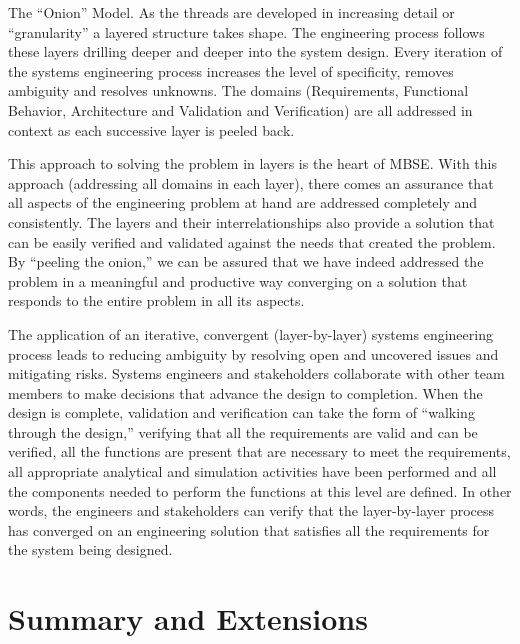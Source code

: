 The ``Onion'' Model. As the threads are developed in increasing detail or ``granularity'' a layered structure takes shape. The engineering process follows these layers drilling deeper and deeper into the system design. Every iteration of the systems engineering process increases the level of specificity, removes ambiguity and resolves unknowns. The domains (Requirements, Functional Behavior, Architecture and Validation and Verification) are all addressed in context as each successive layer is peeled back. 

This approach to solving the problem in layers is the heart of MBSE. With this approach (addressing all domains in each layer), there comes an assurance that all aspects of the engineering problem at hand are addressed completely and consistently. The layers and their interrelationships also provide a solution that can be easily verified and validated against the needs that created the problem. By ``peeling the onion,'' we can be assured that we have indeed addressed the problem in a meaningful and productive way converging on a solution that responds to the entire problem in all its aspects.

The application of an iterative, convergent (layer-by-layer) systems engineering process leads to reducing ambiguity by resolving open and uncovered issues and mitigating risks. Systems engineers and stakeholders collaborate with other team members to make decisions that advance the design to completion. When the design is complete, validation and verification can take the form of ``walking through the design,'' verifying that all the requirements are valid and can be verified, all the functions are present that are necessary to meet the requirements, all appropriate analytical and simulation activities have been performed and all the components needed to perform the functions at this level are defined. In other words, the engineers and stakeholders can verify that the layer-by-layer process has converged on an engineering solution that satisfies all the requirements for the system being designed.


\section{Summary and Extensions}

